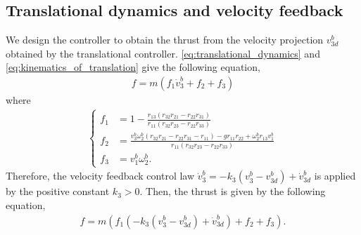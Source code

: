 \subsection{Translational dynamics and velocity feedback}
\label{subsec:translational_dynamics_and_velocity_feedback}
We design the controller to obtain the thrust from the  velocity projection $ v_{3d}^b $ obtained by the translational controller.
\eqref{eq:translational_dynamics} and \eqref{eq:kinematics_of_translation} give the following equation,
\begin{align*}
    f = m (f_1 \dot{v}_3^b + f_2 + f_3)
\end{align*}
where
\begin{align*}
    \begin{cases}
            f_1 &= 1 - \frac{r_{13} (r_{32} r_{21} - r_{22} r_{31})}{r_{11}(r_{32} r_{23} - r_{22} r_{33})}\\
            f_2 &= \frac{v_3^b \omega_2^b (r_{32} r_{21} - r_{22} r_{31}  - r_{11}) - g r_{11} r_{22} + \omega_2^b r_{13} v_1^b}{r_{11} (r_{32} r_{23} - r_{22} r_{33})}\\
            f_3 &= v_1^b \omega_2^b.
    \end{cases}
\end{align*}
Therefore, the velocity feedback control law $ \dot{v}_3^b = -k_3 (v_3^b - v_{3d}^b ) + \dot{v}_{3d}^b $ is applied by the positive constant $ k_3 > 0 $.
Then, the thrust is given by the following equation,
\begin{align*}
    f = m \left (f_1 \left ( -k_3 \left (v_3^b - v_{3d}^b \right ) + \dot{v}_{3d}^b \right ) + f_2 + f_3 \right ).
\end{align*}

